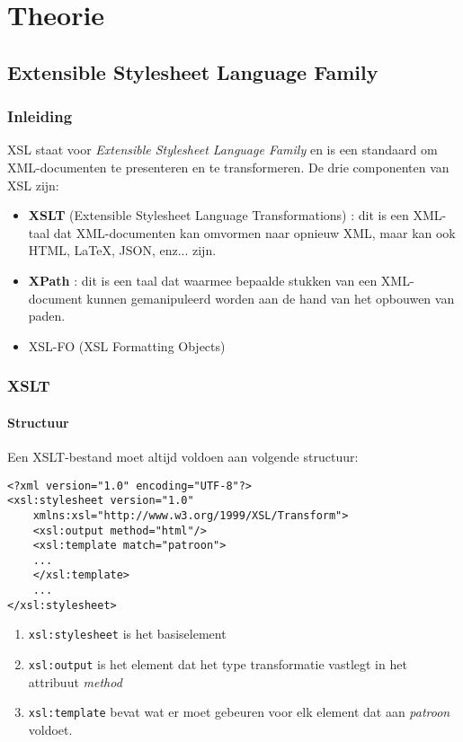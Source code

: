 \documentclass{report}
\begin{document}
	\tableofcontents
	
	\part{Theorie}
	\chapter{Extensible Stylesheet Language Family}
	\section{Inleiding}
	XSL staat voor \textit{Extensible Stylesheet Language Family} en is een standaard om XML-documenten te presenteren en te transformeren. De drie componenten van XSL zijn:
	\begin{itemize}
		\item \textbf{XSLT} (Extensible Stylesheet Language Transformations) : dit is een XML-taal dat XML-documenten kan omvormen naar opnieuw XML, maar kan ook HTML, \LaTeX, JSON, enz... zijn.
		\item \textbf{XPath} : dit is een taal dat waarmee bepaalde stukken van een XML-document kunnen gemanipuleerd worden aan de hand van het opbouwen van paden.
		\item XSL-FO (XSL Formatting Objects)
	\end{itemize}
	\section{XSLT}
	\subsection{Structuur}
	Een XSLT-bestand moet altijd voldoen aan volgende structuur:
	\begin{lstlisting}
<?xml version="1.0" encoding="UTF-8"?>
<xsl:stylesheet version="1.0" 
	xmlns:xsl="http://www.w3.org/1999/XSL/Transform">
	<xsl:output method="html"/>
	<xsl:template match="patroon">
	...
	</xsl:template>
	...
</xsl:stylesheet>
	\end{lstlisting}
	\begin{enumerate}
		\item \texttt{xsl:stylesheet} is het basiselement
		\item \texttt{xsl:output} is het element dat het type transformatie vastlegt in het attribuut \textit{method}
		\item \texttt{xsl:template} bevat wat er moet gebeuren voor elk element dat aan \textit{patroon} voldoet.
	\end{enumerate}
\end{document}

